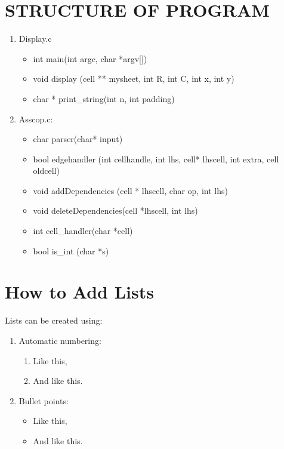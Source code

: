 \documentclass[a4paper]{article}
\begin{document}
\section{STRUCTURE OF PROGRAM}

\begin{enumerate}
    \item Display.c
    \begin{itemize}
        \item int main(int argc, char *argv[])
        \item void display (cell ** mysheet, int R, int C, int x, int y)
        \item char * print\_string(int n, int padding)
    \end{itemize}
    \item Asscop.c:
    \begin{itemize}
        \item char parser(char* input)
        \item bool edgehandler (int cellhandle, int lhs, cell* lhscell, int extra, cell oldcell)
        \item void addDependencies (cell * lhscell, char op, int lhs)
        \item void deleteDependencies(cell *lhscell, int lhs)
        \item int cell\_handler(char *cell)
        \item bool is\_int (char *s)
    \end{itemize}
\end{enumerate}


\section{How to Add Lists}
Lists can be created using:
\begin{enumerate}
    \item Automatic numbering:
    \begin{enumerate}
        \item Like this,
        \item And like this.
    \end{enumerate}
    \item Bullet points:
    \begin{itemize}
        \item Like this,
        \item And like this.
    \end{itemize}
\end{enumerate}
\end{document}
